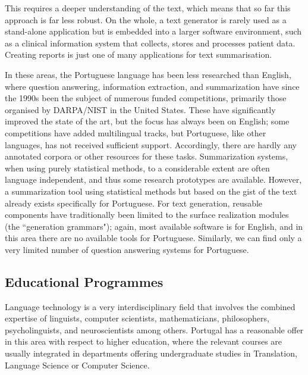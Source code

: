 \documentclass[]{../metanetpaper}
\begin{document}
\begin{multicols}{2}

This requires a deeper understanding of the text, which means that so far this approach is far less robust. On the whole, a text generator is rarely used as a stand-alone application but is embedded into a larger software environment, such as a clinical information system that collects, stores and processes patient data. Creating reports is just one of many applications for text summarisation. 

In these areas, the Portuguese language has been less researched than English, where question answering, information extraction, and summarization have since the 1990s been the subject of numerous funded competitions, primarily those organised by DARPA/NIST in the United States. These have significantly improved the state of the art, but the focus has always been on English; some competitions have added multilingual tracks, but Portuguese, like other languages, has not received sufficient support. Accordingly, there are hardly any annotated corpora or other resources for these tasks. Summarization systems, when using purely statistical methods, to a considerable extent are often language independent, and thus some research prototypes are available. However, a summarization tool using statistical methods but based on the gist of the text already exists specifically for Portuguese. For text generation, reusable components have traditionally been limited to the surface realization modules (the “generation grammars"); again, most available software is for English, and in this area there are no available tools for Portuguese. Similarly, we can find only a very limited number of question answering systems for Portuguese.

\subsection{Educational Programmes}

  Language technology is a very interdisciplinary field that involves the combined expertise of linguists, computer scientists, mathematicians, philosophers, psycholinguists, and neuroscientists among others. Portugal has a reasonable offer in this area with respect to higher education, where the relevant courses are usually integrated in departments offering undergraduate studies in Translation, Language Science or Computer Science.


\end{multicols}
\end{document}
